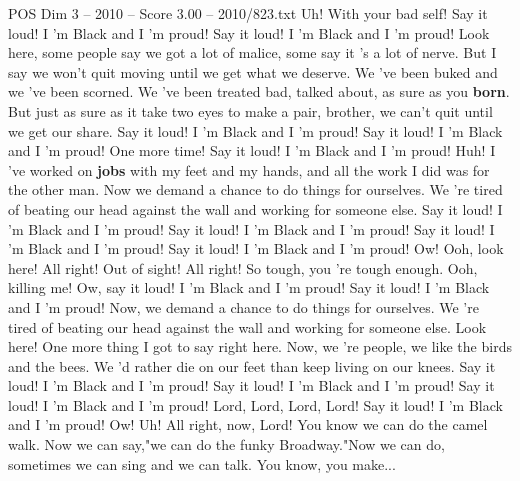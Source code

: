 \begin{textsample}{POS Dim 3 – 2010 – Score 3.00 – 2010/823.txt}  \label{ex:f3_pos_021}
Uh!
With your bad self!
Say it loud!
I 'm Black and I 'm proud!
Say it loud!
I 'm Black and I 'm proud!
Look here, some people say we got a lot of malice, some say it 's a lot of nerve.
But I say we won't quit moving until we get what we deserve.
We 've been buked and we 've been scorned.
We 've been treated bad, talked about, as sure as you \textbf{born}.
But just as sure as it take two eyes to make a pair, brother, we can't quit until we get our share.
Say it loud!
I 'm Black and I 'm proud!
Say it loud!
I 'm Black and I 'm proud!
One more time!
Say it loud!
I 'm Black and I 'm proud!
Huh!
I 've worked on \textbf{jobs} with my feet and my hands, and all the work I did was for the other man.
Now we demand a chance to do things for ourselves.
We 're tired of beating our head against the wall and working for someone else.
Say it loud!
I 'm Black and I 'm proud!
Say it loud!
I 'm Black and I 'm proud!
Say it loud!
I 'm Black and I 'm proud!
Say it loud!
I 'm Black and I 'm proud!
Ow!
Ooh, look here!
All right!
Out of sight!
All right!
So tough, you 're tough enough.
Ooh, killing me!
Ow, say it loud!
I 'm Black and I 'm proud!
Say it loud!
I 'm Black and I 'm proud!
Now, we demand a chance to do things for ourselves.
We 're tired of beating our head against the wall and working for someone else.
Look here!
One more thing I got to say right here.
Now, we 're people, we like the birds and the bees.
We 'd rather die on our feet than keep living on our knees.
Say it loud!
I 'm Black and I 'm proud!
Say it loud!
I 'm Black and I 'm proud!
Say it loud!
I 'm Black and I 'm proud!
Lord, Lord, Lord, Lord!
Say it loud!
I 'm Black and I 'm proud!
Ow!
Uh!
All right, now, Lord!
You know we can do the camel walk.
Now we can say,"we can do the funky Broadway."Now we can do, sometimes we can sing and we can talk.
You know, you make...

\end{textsample}
